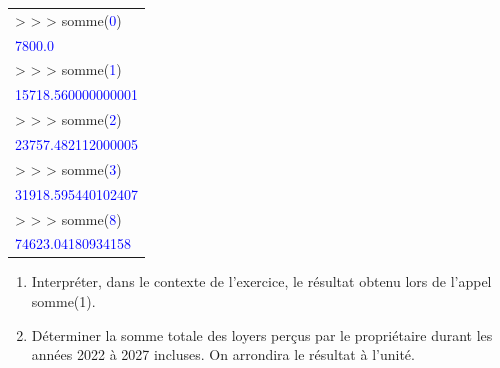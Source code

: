 \begin{enumerate}
\begin{center}
\begin{tabular}[]{|l}
>\! >\! > somme(\textcolor{blue}{0})\\
\textcolor{blue}{7800.0}\\
>\! >\! > somme(\textcolor{blue}{1})\\
\textcolor{blue}{15718.560000000001}\\
>\! >\! > somme(\textcolor{blue}{2})\\
\textcolor{blue}{23757.482112000005}\\
>\! >\! > somme(\textcolor{blue}{3})\\
\textcolor{blue}{31918.595440102407}\\
>\! >\! > somme(\textcolor{blue}{8})\\
\textcolor{blue}{74623.04180934158}\\
\end{tabular}
\end{center}
	\begin{enumerate}
		\item Interpréter, dans le contexte de l'exercice, le résultat obtenu lors de l'appel somme(1).
		\item Déterminer la somme totale des loyers perçus par le propriétaire durant les années
2022 à 2027 incluses. On arrondira le résultat à l'unité.
	\end{enumerate}
\end{enumerate}
